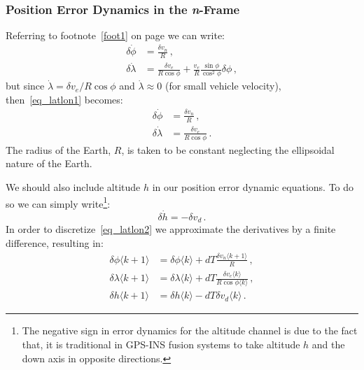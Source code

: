 \documentclass[journal]{IEEEtran}
\begin{document}
%
\subsubsection{Position Error Dynamics in the \textit{n}-Frame}
Referring to footnote~\ref{foot1} on page  \pageref{foot1} we can write:
\begin{equation}\label{eq_latlon1}
\begin{split}
        \delta\dot\phi&=\frac{\delta v_n}{R}\,,\\
        \delta\dot\lambda&= \frac{\delta v_e}{R\cos\phi}+\frac{v_e}{R}\frac{\sin\phi}{\cos^2\phi}\delta\phi\,,
    \end{split}
\end{equation}
but since $\dot\lambda= {\delta v_e}/{R\cos\phi}$
and $\dot\lambda\approx 0$ (for small vehicle velocity), then~\eqref{eq_latlon1} becomes:
\begin{equation}\label{eq_latlon2}
\begin{split}
        \delta\dot\phi&=\frac{\delta v_n}{R}\,,\\
        \delta\dot\lambda&= \frac{\delta v_e}{R\cos\phi}\,.
    \end{split}
\end{equation}
The radius of the Earth, $R$, is taken to be constant neglecting the ellipsoidal nature of the Earth.\par
We should also include altitude $h$ in our position error dynamic equations. To do so we can simply write\footnote{The negative sign in error dynamics for the altitude channel is due to the fact that, it is traditional in GPS-INS fusion systems to take altitude $h$ and the down axis in opposite directions.}:
\begin{equation}
    \delta\dot{h}=-\delta v_d\,.
\end{equation}
In order to discretize~\eqref{eq_latlon2} we approximate the derivatives by a finite difference, resulting in:
\begin{equation}\label{eq_latlon3}
\begin{split}
        \delta\phi\langle k+1 \rangle &=\delta\phi\langle k \rangle +dT\frac{\delta v_n\langle k+1 \rangle}{R}\,,\\
        \delta\lambda\langle k+1 \rangle &=\delta\lambda\langle k \rangle +dT\frac{\delta v_e\langle k \rangle}{R\cos\phi\langle k \rangle}\,,\\
        \delta h \langle k+1 \rangle &=\delta h\langle k \rangle -dT{\delta v_d\langle k \rangle}\,.
       \end{split}
\end{equation}
\end{document}
